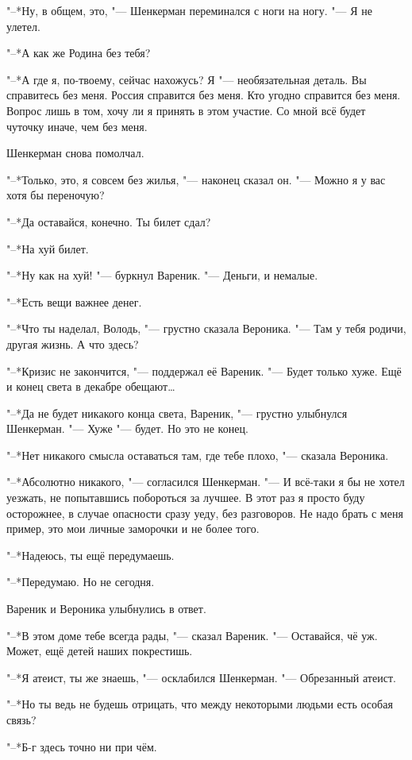 "--*Ну, в общем, это, "--- Шенкерман переминался с ноги на ногу.
"--- Я не улетел.

"--*А как же Родина без тебя?

"--*А где я, по-твоему, сейчас нахожусь?
Я "--- необязательная деталь.
Вы справитесь без меня.
Россия справится без меня.
Кто угодно справится без меня.
Вопрос лишь в том, хочу ли я принять в этом участие.
Со мной всё будет чуточку иначе, чем без меня.

Шенкерман снова помолчал.

"--*Только, это, я совсем без жилья, "--- наконец сказал он.
"--- Можно я у вас хотя бы переночую?

"--*Да оставайся, конечно.
Ты билет сдал?

"--*На хуй билет.

"--*Ну как на хуй! "--- буркнул Вареник.
"--- Деньги, и немалые.

"--*Есть вещи важнее денег.

"--*Что ты наделал, Володь, "--- грустно сказала Вероника.
"--- Там у тебя родичи, другая жизнь.
А что здесь?

"--*Кризис не закончится, "--- поддержал её Вареник.
"--- Будет только хуже.
Ещё и конец света в декабре обещают\dots{}

"--*Да не будет никакого конца света, Вареник, "--- грустно улыбнулся Шенкерман.
"--- Хуже "--- будет.
Но это не конец.

"--*Нет никакого смысла оставаться там, где тебе плохо, "--- сказала Вероника.

"--*Абсолютно никакого, "--- согласился Шенкерман.
"--- И всё-таки я бы не хотел уезжать, не попытавшись побороться за лучшее.
В этот раз я просто буду осторожнее, в случае опасности сразу уеду, без разговоров.
Не надо брать с меня пример, это мои личные заморочки и не более того.

"--*Надеюсь, ты ещё передумаешь.

"--*Передумаю.
Но не сегодня.

Вареник и Вероника улыбнулись в ответ.

"--*В этом доме тебе всегда рады, "--- сказал Вареник.
"--- Оставайся, чё уж.
Может, ещё детей наших покрестишь.

"--*Я атеист, ты же знаешь, "--- осклабился Шенкерман.
"--- Обрезанный атеист.

"--*Но ты ведь не будешь отрицать, что между некоторыми людьми есть особая связь?

"--*Б-г здесь точно ни при чём.

